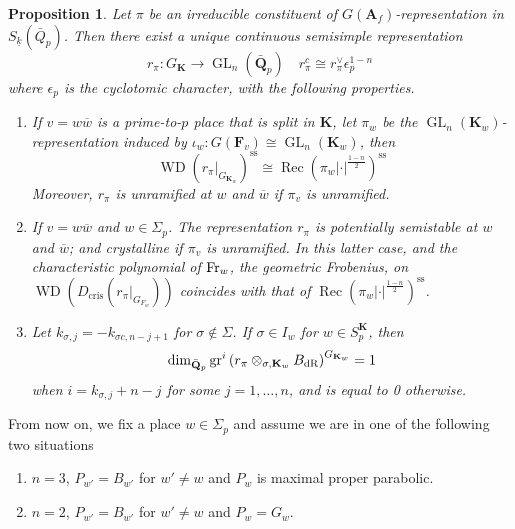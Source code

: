 \documentclass[leqno]{amsart}
\newcommand{\wt}[1]{\underline{ #1 }}
\newcommand{\bw}{\overline{w}}
\newcommand{\Fr}{\textnormal{Fr}} %
\newcommand{\dR}{\textnormal{dR}}
\DeclareMathOperator{\WD}{WD}
\DeclareMathOperator{\Rec}{Rec}
\DeclareMathOperator{\GL}{GL}
\newcommand{\Q}{{\mathbf{Q}}}
\newcommand{\A}{\mathbf A}
\newcommand{\F}{{\mathbf{F}}} %
\newcommand{\K}{{\mathbf{K}}} %
\newtheorem{prop}[thm]{Proposition}
\theoremstyle{definition}
\theoremstyle{remark}
\begin{document}
\begin{prop}\cite[Prop.2.27]{ger}
	Let $\pi$ be an irreducible constituent of 
	$G(\A_f)$-representation in $S_{\wt{k}}(\bar{Q}_p)$.
	Then there exist a unique continuous semisimple representation
	\[
	r_\pi: G_\K \rightarrow \GL_n(\bar{\Q}_p)\quad
	r_\pi^c \cong r_\pi^{\vee} \epsilon_p^{1-n}
	\]
	where $\epsilon_p$ is the cyclotomic character,
	with the following properties.
\begin{enumerate}[label=(\alph*)]
\item If $v=w\bw$ is a prime-to-$p$ place that is split in $\K$,
let $\pi_w$ be the $\GL_n(\K_w)$-representation
induced by $\iota_w\colon G(\F_v)\cong \GL_n(\K_w)$, then
\[
\WD\left(\left.r_\pi\right|_{G_{\K_w}}\right)^{\mathrm{ss}} \cong
\Rec(\pi_w|\cdot|^{\frac{1-n}{2}})^{\mathrm{ss}}
\]
Moreover, $r_\pi$ is unramified at $w$ and $\bw$ if $\pi_v$ is unramified.
\item If $v=w\bw$ and  $w\in \Sigma_p$.
The representation $r_\pi$ is potentially semistable at $w$ and  $\bw$;
and crystalline if $\pi_v$ is unramified.
In this latter case, 
and the characteristic polynomial of $\Fr_w$, the geometric Frobenius,
on $\WD\left(D_{\mathrm{cris }}\left(\left.r_\pi\right|_{G_{F_w}}\right)\right)$
coincides with that of $\Rec(\pi_w|\cdot|^{\frac{1-n}{2}})^{\mathrm{ss}}$.
\item 
Let $k_{\sigma,j}=-k_{\sigma c, n-j+1}$
for $\sigma\notin \Sigma$.
If $\sigma\in I_w$ for $w\in S_p^\K$, then
\[
\dim_{\bar{\Q}_p}\operatorname{gr}^i
\left(r_\pi \otimes_{\sigma, \K_w} B_{\dR}\right)^{G_{\K_w}}=1
\]
when $i=k_{\sigma, j}+n-j$ 
for some $j=1, \ldots, n$, and is equal to 0 otherwise.
\end{enumerate}
\end{prop}

From now on,
we fix a place $w\in \Sigma_p$ and
assume we are in one of the following two situations
\begin{enumerate}[label=(\Roman*)]
	\item $n=3$, $P_{w'}=B_{w'}$ for $w'\neq w$ and $P_w$ is
		maximal proper parabolic.
	\item $n=2$, $P_{w'}=B_{w'}$ for $w'\neq w$ and $P_w=G_w$.
\end{enumerate}
\end{document}
